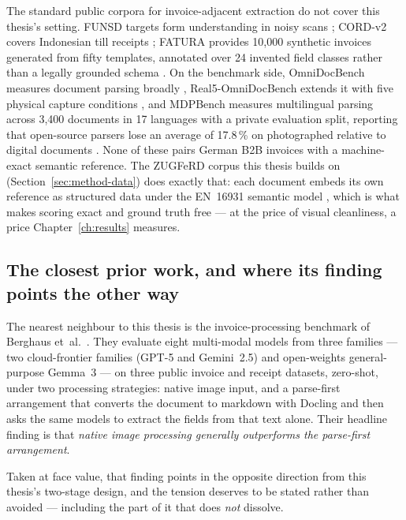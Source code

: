 The standard public corpora for invoice-adjacent extraction do not cover this thesis's
setting. FUNSD targets form understanding in noisy scans \parencite{jaume2019funsd};
CORD-v2 covers Indonesian till receipts \parencite{cordv2}; FATURA provides 10{,}000
synthetic invoices generated from fifty templates, annotated over 24 invented field classes
rather than a legally grounded schema \parencite{fatura2}. On the benchmark side, OmniDocBench measures document parsing
broadly \parencite{omnidocbench}, Real5-OmniDocBench extends it with five physical capture
conditions \parencite{real5omnidocbench}, and MDPBench measures multilingual parsing across
3{,}400 documents in 17 languages with a private evaluation split, reporting that
open-source parsers lose an average of 17.8\,\% on photographed relative to digital
documents \parencite{mdpbench2026}. None of these pairs German \ac{B2B} invoices with a
machine-exact semantic reference. The \ac{ZUGFeRD} corpus this thesis builds on
(Section~\ref{sec:method-data}) does exactly that: each document embeds its own reference as
structured data under the \ac{EN}~16931 semantic model \parencite{en16931}, which is what makes
scoring exact and ground truth free --- at the price of visual cleanliness, a price
Chapter~\ref{ch:results} measures.

\subsection{The closest prior work, and where its finding points the other way}
\label{sec:rw-berghaus}

The nearest neighbour to this thesis is the invoice-processing benchmark of
Berghaus et~al.\ \parencite{berghaus2025}. They evaluate eight multi-modal models from three families --- two
cloud-frontier families (GPT-5 and Gemini~2.5) and open-weights general-purpose Gemma~3 ---
on three public invoice and receipt datasets, zero-shot, under two processing strategies:
native image input, and a parse-first arrangement that converts the document to markdown
with Docling \parencite{docling2025} and then asks the same models to extract the fields
from that text alone. Their headline finding is
that \emph{native image processing generally outperforms the parse-first arrangement}.

Taken at face value, that finding points in the opposite direction from this thesis's
two-stage design, and the tension deserves to be stated rather than avoided --- including the
part of it that does \emph{not} dissolve.

